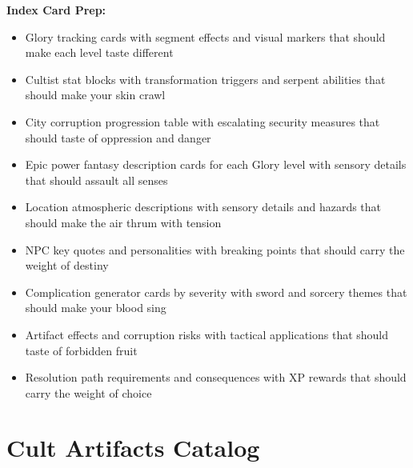 \documentclass[11pt]{article}
\begin{document}
\textbf{Index Card Prep:}
\begin{itemize}
\item Glory tracking cards with segment effects and visual markers that should make each level taste different
\item Cultist stat blocks with transformation triggers and serpent abilities that should make your skin crawl
\item City corruption progression table with escalating security measures that should taste of oppression and danger
\item Epic power fantasy description cards for each Glory level with sensory details that should assault all senses
\item Location atmospheric descriptions with sensory details and hazards that should make the air thrum with tension
\item NPC key quotes and personalities with breaking points that should carry the weight of destiny
\item Complication generator cards by severity with sword and sorcery themes that should make your blood sing
\item Artifact effects and corruption risks with tactical applications that should taste of forbidden fruit
\item Resolution path requirements and consequences with XP rewards that should carry the weight of choice
\end{itemize}

\section{Cult Artifacts Catalog}
\end{document}
